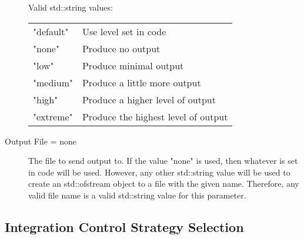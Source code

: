 \begin{list}{}
\begin{description}
  Valid std::string values:

      \begin{tabular}{lp{}}
      "default" & Use level set in code \\ 
      "none" & Produce no output \\ 
      "low" & Produce minimal output \\ 
      "medium" & Produce a little more output \\ 
      "high" & Produce a higher level of output \\ 
      "extreme" & Produce the highest level of output \\ 
      \end{tabular}
      \item[Output File = none] 
The file to send output to.  If the value "none" is used, then
whatever is set in code will be used.  However, any other std::string value
will be used to create an std::ofstream object to a file with the given name.
Therefore, any valid file name is a valid std::string value for this parameter.
\end{description}

\end{list}

\subsection{Integration Control Strategy Selection}
\label{sec:Integration Control Strategy Selection}

